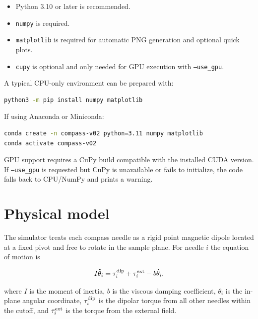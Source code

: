 \documentclass[11pt,a4paper]{article}
\newcommand{\code}[1]{\texttt{#1}}
\begin{document}
\begin{itemize}[leftmargin=*]
    \item Python 3.10 or later is recommended.
    \item \code{numpy} is required.
    \item \code{matplotlib} is required for automatic PNG generation and optional quick plots.
    \item \code{cupy} is optional and only needed for GPU execution with \code{--use\_gpu}.
\end{itemize}

A typical CPU-only environment can be prepared with:

\begin{lstlisting}[language=bash]
python3 -m pip install numpy matplotlib
\end{lstlisting}

If using Anaconda or Miniconda:

\begin{lstlisting}[language=bash]
conda create -n compass-v02 python=3.11 numpy matplotlib
conda activate compass-v02
\end{lstlisting}

GPU support requires a CuPy build compatible with the installed CUDA version. If \code{--use\_gpu} is requested but CuPy is unavailable or fails to initialize, the code falls back to CPU/NumPy and prints a warning.

\section{Physical model}
\label{sec:model}

The simulator treats each compass needle as a rigid point magnetic dipole located at a fixed pivot and free to rotate in the sample plane. For needle $i$ the equation of motion is

\begin{equation}
I\ddot{\theta}_i = \tau_i^{\rm dip} + \tau_i^{\rm ext} - b\dot{\theta}_i,
\label{eq:eom}
\end{equation}

where $I$ is the moment of inertia, $b$ is the viscous damping coefficient, $\theta_i$ is the in-plane angular coordinate, $\tau_i^{\rm dip}$ is the dipolar torque from all other needles within the cutoff, and $\tau_i^{\rm ext}$ is the torque from the external field.
\end{document}
